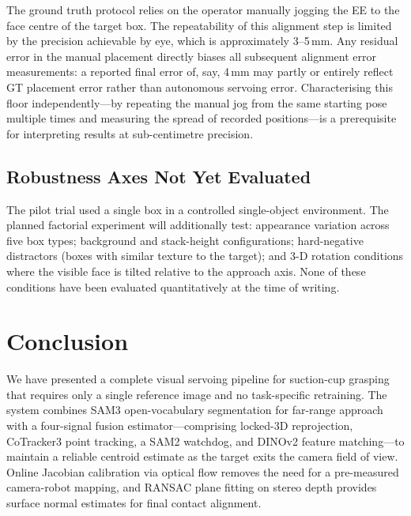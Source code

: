 \documentclass[lettersize,journal]{IEEEtran}
\begin{document}
The ground truth protocol relies on the operator manually jogging the EE
to the face centre of the target box.  The repeatability of this alignment
step is limited by the precision achievable by eye, which is approximately
3--5\,mm.  Any residual error in the manual placement directly biases all
subsequent alignment error measurements: a reported final error of, say,
4\,mm may partly or entirely reflect GT placement error rather than
autonomous servoing error.  Characterising this floor independently---by
repeating the manual jog from the same starting pose multiple times and
measuring the spread of recorded positions---is a prerequisite for
interpreting results at sub-centimetre precision.

\subsection{Robustness Axes Not Yet Evaluated}

The pilot trial used a single box in a controlled single-object environment.
The planned factorial experiment will additionally test: appearance variation
across five box types; background and stack-height configurations;
hard-negative distractors (boxes with similar texture to the target); and
3-D rotation conditions where the visible face is tilted relative to the
approach axis.  None of these conditions have been evaluated quantitatively
at the time of writing.


\section{Conclusion}
\label{sec:conclusion}

We have presented a complete visual servoing pipeline for suction-cup grasping
that requires only a single reference image and no task-specific retraining.
The system combines SAM3 open-vocabulary segmentation for far-range approach
with a four-signal fusion estimator---comprising locked-3D reprojection,
CoTracker3 point tracking, a SAM2 watchdog, and DINOv2 feature
matching---to maintain a reliable centroid estimate as the target exits the
camera field of view.  Online Jacobian calibration via optical flow removes
the need for a pre-measured camera-robot mapping, and RANSAC plane fitting on
stereo depth provides surface normal estimates for final contact alignment.
\end{document}
